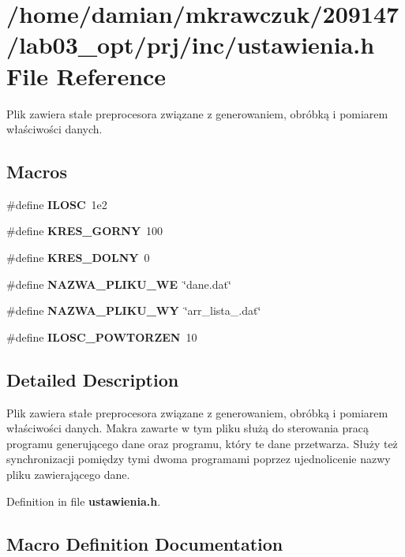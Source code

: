 \section{/home/damian/mkrawczuk/209147/lab03\-\_\-opt/prj/inc/ustawienia.h File Reference}
\label{ustawienia_8h}


Plik zawiera stałe preprocesora związane z generowaniem, obróbką i pomiarem właściwości danych.  


\subsection*{Macros}
\begin{DoxyCompactItemize}
\item 
\#define {\bf I\-L\-O\-S\-C}~1e2
\item 
\#define {\bf K\-R\-E\-S\-\_\-\-G\-O\-R\-N\-Y}~100
\item 
\#define {\bf K\-R\-E\-S\-\_\-\-D\-O\-L\-N\-Y}~0
\item 
\#define {\bf N\-A\-Z\-W\-A\-\_\-\-P\-L\-I\-K\-U\-\_\-\-W\-E}~\char`\"{}dane.\-dat\char`\"{}
\item 
\#define {\bf N\-A\-Z\-W\-A\-\_\-\-P\-L\-I\-K\-U\-\_\-\-W\-Y}~\char`\"{}arr\-\_\-lista\-\_.\-dat\char`\"{}
\item 
\#define {\bf I\-L\-O\-S\-C\-\_\-\-P\-O\-W\-T\-O\-R\-Z\-E\-N}~10
\end{DoxyCompactItemize}


\subsection{Detailed Description}
Plik zawiera stałe preprocesora związane z generowaniem, obróbką i pomiarem właściwości danych. Makra zawarte w tym pliku służą do sterowania pracą programu generującego dane oraz programu, który te dane przetwarza. Służy też synchronizacji pomiędzy tymi dwoma programami poprzez ujednolicenie nazwy pliku zawierającego dane. 

Definition in file {\bf ustawienia.\-h}.



\subsection{Macro Definition Documentation}
